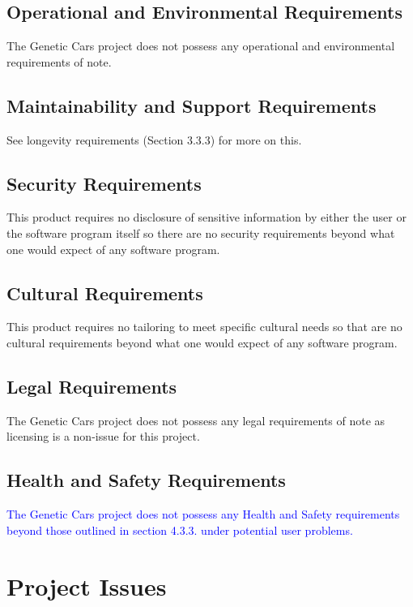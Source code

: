 \documentclass[12pt, titlepage]{article}
\begin{document}
\subsection{Operational and Environmental Requirements}

The Genetic Cars project does not possess any operational and environmental 
requirements of note.

\subsection{Maintainability and Support Requirements}

See longevity requirements (Section 3.3.3) for more on this.

\subsection{Security Requirements}

This product requires no disclosure of sensitive information by either the user 
or the software program itself so there are no security requirements beyond what 
one would expect of any software program.

\subsection{Cultural Requirements}

This product requires no tailoring to meet specific cultural needs so that are 
no cultural requirements beyond what one would expect of any software program.

\subsection{Legal Requirements}

The Genetic Cars project does not possess any legal requirements of note as 
licensing is a non-issue for this project.

\subsection{Health and Safety Requirements}

\textcolor{blue}{The Genetic Cars project does not possess any Health and Safety 
requirements beyond those outlined in section 4.3.3. under potential user 
problems.}

\section{Project Issues}
\end{document}
